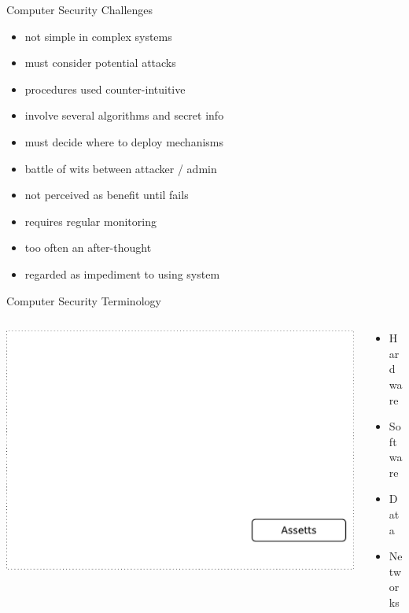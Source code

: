 \documentclass{beamer}
\begin{document}
\begin{frame}{Computer Security Challenges}
  \begin{itemize}
\item not simple in complex systems 
\item must consider potential attacks 
\item procedures used counter-intuitive 
\item involve several algorithms and secret info 
\item must decide where to deploy mechanisms 
\item battle of wits between attacker / admin 
\item not perceived as benefit until fails 
\item requires regular monitoring 
\item too often an after-thought 
\item regarded as impediment to using system
  \end{itemize}
\end{frame}

\begin{frame}{Computer Security Terminology}
\begin{columns}[onlytextwidth]
    \begin{column}{0.6\textwidth}
\includegraphics[width=1\linewidth]{term-0}
  \end{column}
    \begin{column}{0.4\textwidth}
  \begin{itemize}
  \item Hardware
  \item Software
  \item Data
  \item Networks
  \end{itemize}
  \end{column}
\end{columns}
\end{frame}
\end{document}
